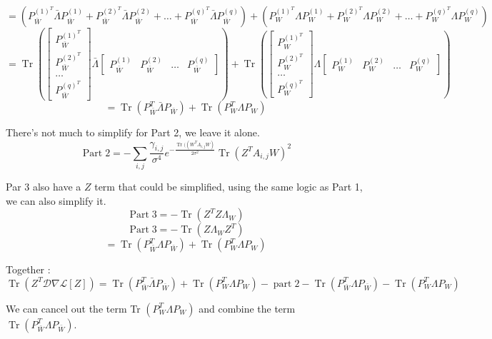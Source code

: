 \documentclass{article}
\newcommand{\nobracket}{}
\newcommand{\tmop}[1]{\ensuremath{\operatorname{#1}}}
\begin{document}
\[ = ( P_{\bar{W}}^{( 1)^T} \bar{\Lambda} P_{\bar{W}}^{( 1)} + P_{\bar{W}}^{(
   2)^T} \bar{\Lambda} P_{\bar{W}}^{( 2)} + \ldots + P_{\bar{W}}^{( q)^T}
   \bar{\Lambda} P_{\bar{W}}^{( q)} ) + ( P_W^{( 1)^T} \Lambda P_W^{( 1)} +
   P_W^{( 2)^T} \Lambda P_W^{( 2)} + \ldots + P_W^{( q)^T} \Lambda P_W^{( q)}
   ) \]
\[ = \tmop{Tr} \left( \left[ \begin{array}{l}
     P_{\bar{W}}^{( 1)^T}\\
     P_{\bar{W}}^{( 2)^T}\\
     \ldots\\
     P_{\bar{W}}^{( q)^T}
   \end{array} \right] \bar{\Lambda} \left[ \begin{array}{llll}
     P_{\bar{W}}^{( 1)} & P_{\bar{W}}^{( 2)} & \ldots & P_{\bar{W}}^{( q)}
   \end{array} \right]  \right) + \tmop{Tr} \left( \left[ \begin{array}{l}
     P_W^{( 1)^T}\\
     P_W^{( 2)^T}\\
     \ldots\\
     P_W^{( q)^T}
   \end{array} \right] \Lambda \left[ \begin{array}{llll}
     P_W^{( 1)} & P_W^{( 2)} & \ldots & P_W^{( q)}
   \end{array} \right]  \right) \]
\[ = \tmop{Tr} ( P_{\bar{W}}^T  \bar{\Lambda} P_{\bar{W}} ) + \tmop{Tr} (
   P_W^T \Lambda P_W ) \]


There's not much to simplify for Part 2, we leave it alone.
\[ \tmop{Part} 2 = - \sum_{i, j} \frac{\gamma_{i, j}}{\sigma^4} e^{-
   \frac{\tmop{Tr} ( ( W^T A_{i, j} W \nobracket)}{2 \sigma^2}} \tmop{Tr} (
   Z^T A_{i, j} W)^2 \]


Par 3 also have a $Z$ term that could be simplified, using the same logic as
Part 1, we can also simplify it.
\[ \tmop{Part} 3 = - \tmop{Tr} ( Z^T Z \Lambda_W) \]
\[ \tmop{Part} 3 = - \tmop{Tr} ( Z \Lambda_W Z^T) \]
\[ = \tmop{Tr} ( P_{\bar{W}}^T \Lambda P_{\bar{W}} ) + \tmop{Tr} ( P_W^T
   \Lambda P_W ) \]


Together :
\[ \tmop{Tr} ( Z^T \mathcal{D} \nabla \mathcal{L} [ Z]) = \tmop{Tr} (
   P_{\bar{W}}^T  \bar{\Lambda} P_{\bar{W}} ) + \tmop{Tr} ( P_W^T \Lambda P_W
   ) - \tmop{part} 2 - \tmop{Tr} ( P_{\bar{W}}^T \Lambda P_{\bar{W}} ) -
   \tmop{Tr} ( P_W^T \Lambda P_W ) \]


We can cancel out the term Tr $( P_W^T \Lambda P_W )$ and combine the term
$\tmop{Tr} ( P_{\bar{W}}^T \Lambda P_{\bar{W}} )$.
\end{document}
